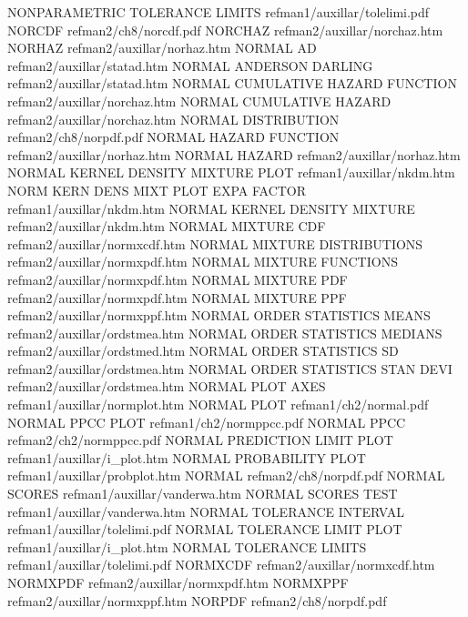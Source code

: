 NONPARAMETRIC TOLERANCE LIMITS          refman1/auxillar/tolelimi.pdf
NORCDF                                  refman2/ch8/norcdf.pdf
NORCHAZ                                 refman2/auxillar/norchaz.htm
NORHAZ                                  refman2/auxillar/norhaz.htm
NORMAL AD                               refman2/auxillar/statad.htm
NORMAL ANDERSON DARLING                 refman2/auxillar/statad.htm
NORMAL CUMULATIVE HAZARD FUNCTION       refman2/auxillar/norchaz.htm
NORMAL CUMULATIVE HAZARD                refman2/auxillar/norchaz.htm
NORMAL DISTRIBUTION                     refman2/ch8/norpdf.pdf
NORMAL HAZARD FUNCTION                  refman2/auxillar/norhaz.htm
NORMAL HAZARD                           refman2/auxillar/norhaz.htm
NORMAL KERNEL DENSITY MIXTURE PLOT      refman1/auxillar/nkdm.htm
NORM KERN DENS MIXT PLOT EXPA FACTOR    refman1/auxillar/nkdm.htm
NORMAL KERNEL DENSITY MIXTURE           refman2/auxillar/nkdm.htm
NORMAL MIXTURE CDF                      refman2/auxillar/normxcdf.htm
NORMAL MIXTURE DISTRIBUTIONS            refman2/auxillar/normxpdf.htm
NORMAL MIXTURE FUNCTIONS                refman2/auxillar/normxpdf.htm
NORMAL MIXTURE PDF                      refman2/auxillar/normxpdf.htm
NORMAL MIXTURE PPF                      refman2/auxillar/normxppf.htm
NORMAL ORDER STATISTICS MEANS           refman2/auxillar/ordstmea.htm
NORMAL ORDER STATISTICS MEDIANS         refman2/auxillar/ordstmed.htm
NORMAL ORDER STATISTICS SD              refman2/auxillar/ordstmea.htm
NORMAL ORDER STATISTICS STAN DEVI       refman2/auxillar/ordstmea.htm
NORMAL PLOT AXES                        refman1/auxillar/normplot.htm
NORMAL PLOT                             refman1/ch2/normal.pdf
NORMAL PPCC PLOT                        refman1/ch2/normppcc.pdf
NORMAL PPCC                             refman2/ch2/normppcc.pdf
NORMAL PREDICTION LIMIT PLOT            refman1/auxillar/i_plot.htm
NORMAL PROBABILITY PLOT                 refman1/auxillar/probplot.htm
NORMAL                                  refman2/ch8/norpdf.pdf
NORMAL SCORES                           refman1/auxillar/vanderwa.htm
NORMAL SCORES TEST                      refman1/auxillar/vanderwa.htm
NORMAL TOLERANCE INTERVAL               refman1/auxillar/tolelimi.pdf
NORMAL TOLERANCE LIMIT PLOT             refman1/auxillar/i_plot.htm
NORMAL TOLERANCE LIMITS                 refman1/auxillar/tolelimi.pdf
NORMXCDF                                refman2/auxillar/normxcdf.htm
NORMXPDF                                refman2/auxillar/normxpdf.htm
NORMXPPF                                refman2/auxillar/normxppf.htm
NORPDF                                  refman2/ch8/norpdf.pdf
